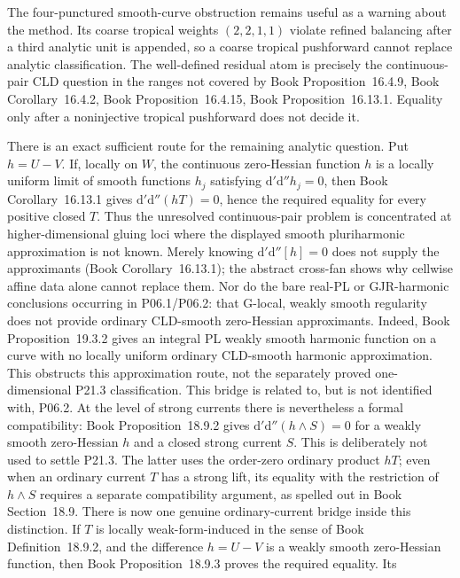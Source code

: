 \documentclass[11pt,a4paper]{article}
\theoremstyle{definition}
\theoremstyle{remark}
\begin{document}
The four-punctured smooth-curve obstruction remains useful as a warning about
the method.  Its coarse tropical weights \((2,2,1,1)\) violate refined
balancing after a third analytic unit is appended, so a coarse tropical
pushforward cannot replace analytic classification.  The well-defined
residual atom is precisely the continuous-pair CLD question in the ranges
not covered by
Book Proposition~16.4.9, Book Corollary~16.4.2, Book Proposition~16.4.15, Book Proposition~16.13.1.  Equality only after a
noninjective tropical pushforward does not decide it.

There is an exact sufficient route for the remaining analytic question.  Put
\(h=U-V\).  If, locally on \(W\), the continuous zero-Hessian function
\(h\) is a locally uniform limit of smooth functions \(h_j\) satisfying
\(\mathrm d'\mathrm d''h_j=0\), then
Book Corollary~16.13.1 gives
\(\mathrm d'\mathrm d''(hT)=0\), hence the required equality for every
positive closed \(T\).  Thus the unresolved continuous-pair problem is
concentrated at higher-dimensional gluing loci where the displayed smooth
pluriharmonic approximation is not known.  Merely knowing
\(\mathrm d'\mathrm d''[h]=0\) does not supply the approximants
(Book Corollary~16.13.1); the abstract cross-fan shows why
cellwise affine data alone cannot replace them.  Nor do the bare real-PL or
GJR-harmonic conclusions occurring in P06.1/P06.2: that G-local,
weakly smooth regularity does not provide ordinary CLD-smooth zero-Hessian
approximants.  Indeed,
Book Proposition~19.3.2 gives an integral PL
weakly smooth harmonic function on a curve with no locally uniform ordinary
CLD-smooth harmonic approximation.  This obstructs this approximation route,
not the separately proved one-dimensional P21.3 classification.  This bridge
is related to, but is not identified with, P06.2.
At the level of strong currents there is nevertheless a formal compatibility:
Book Proposition~18.9.2 gives
\(\mathrm d'\mathrm d''(h\wedge S)=0\) for a weakly smooth zero-Hessian
\(h\) and a closed strong current \(S\).  This is deliberately not used to
settle P21.3.  The latter uses the order-zero ordinary product \(hT\); even
when an ordinary current \(T\) has a strong lift, its equality with the
restriction of \(h\wedge S\) requires a separate compatibility argument, as
spelled out in Book Section~18.9.
There is now one genuine ordinary-current bridge inside this distinction.
If \(T\) is locally weak-form-induced in the sense of
Book Definition~18.9.2, and the difference \(h=U-V\) is a
weakly smooth zero-Hessian function, then
Book Proposition~18.9.3 proves the required equality.  Its
\end{document}
